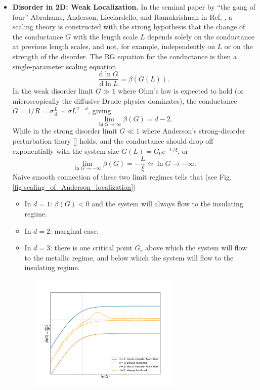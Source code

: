 \begin{itemize}
    \item \textbf{Disorder in 2D: Weak Localization.} In the seminal paper by ``the gang of four'' Abrahams, Anderson, Licciardello, and Ramakrishnan in Ref. \cite{abrahams1979scaling}, a scaling theory is constructed with the strong hypothesis that the change of the conductance $G$ with the length scale $L$ depends solely on the conductance at previous length scales, and not, for example, independently on $L$ or on the strength of the disorder. The RG equation for the conductance is then a single-parameter scaling equation
          \begin{equation*}
              \dfrac{\mathrm d\ln G}{\mathrm d\ln L}=\beta(G(L)).
          \end{equation*}
          In the weak disorder limit $G\gg1$ where Ohm's law is expected to hold (or microscopically the diffusive Drude physics dominates), the conductance $G=1/R=\sigma\frac{L}{A}\sim\sigma L^{2-d}$, giving
          \begin{equation*}
              \lim_{\ln G\rightarrow\infty}\beta(G)=d-2.
          \end{equation*}
          While in the strong disorder limit $G\ll1$ where Anderson's strong-disorder perturbation thory [] holds, and the conductance should drop off exponentially with the system size $G(L)=G_0 e^{-L/\xi}$, or
          \begin{equation*}
              \lim_{\ln G\rightarrow-\infty}\beta(G)=-\frac{L}{\xi}\simeq\ln G\rightarrow-\infty.
          \end{equation*}
          Naive smooth connection of these two limit regimes tells that (see Fig. \ref{fig:scaling_of_Anderson_localization})
          \begin{itemize}
              \item In $d=1$: $\beta(G)<0$ and the system will always flow to the insulating regime.
              \item In $d=2$: marginal case.
              \item In $d=3$: there is one critical point $G_c$ above which the system will flow to the metallic regime, and below which the system will flow to the insulating regime.
          \end{itemize}
          \begin{figure}[!htp]
              \centering
              \includegraphics[width=0.7\textwidth]{figures/scaling_of_Anderson_localization.pdf}

\end{figure}
\end{itemize}
